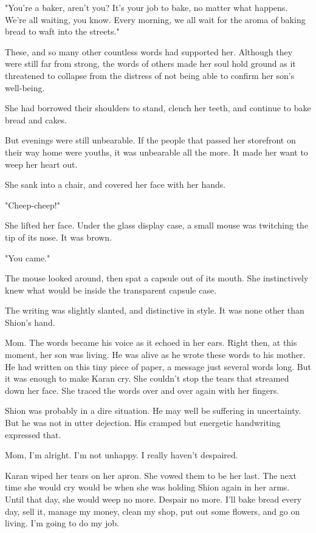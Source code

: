 "You're a baker, aren't you? It's your job to bake, no matter what
happens. We're all waiting, you know. Every morning, we all wait for the
aroma of baking bread to waft into the streets."

These, and so many other countless words had supported her. Although
they were still far from strong, the words of others made her soul hold
ground as it threatened to collapse from the distress of not being able
to confirm her son's well-being.

She had borrowed their shoulders to stand, clench her teeth, and
continue to bake bread and cakes.

But evenings were still unbearable. If the people that passed her
storefront on their way home were youths, it was unbearable all the
more. It made her want to weep her heart out.

She sank into a chair, and covered her face with her hands.

"Cheep-cheep!"

She lifted her face. Under the glass display case, a small mouse was
twitching the tip of its nose. It was brown.

"You came."

The mouse looked around, then spat a capsule out of its mouth. She
instinctively knew what would be inside the transparent capsule case.

The writing was slightly slanted, and distinctive in style. It was none
other than Shion's hand.

Mom. The words became his voice as it echoed in her ears. Right then, at
this moment, her son was living. He was alive as he wrote these words to
his mother. He had written on this tiny piece of paper, a message just
several words long. But it was enough to make Karan cry. She couldn't
stop the tears that streamed down her face. She traced the words over
and over again with her fingers.

Shion was probably in a dire situation. He may well be suffering in
uncertainty. But he was not in utter dejection. His cramped but
energetic handwriting expressed that.

Mom, I'm alright. I'm not unhappy. I really haven't despaired.

Karan wiped her tears on her apron. She vowed them to be her last. The
next time she would cry would be when she was holding Shion again in her
arms. Until that day, she would weep no more. Despair no more. I'll bake
bread every day, sell it, manage my money, clean my shop, put out some
flowers, and go on living. I'm going to do my job.

